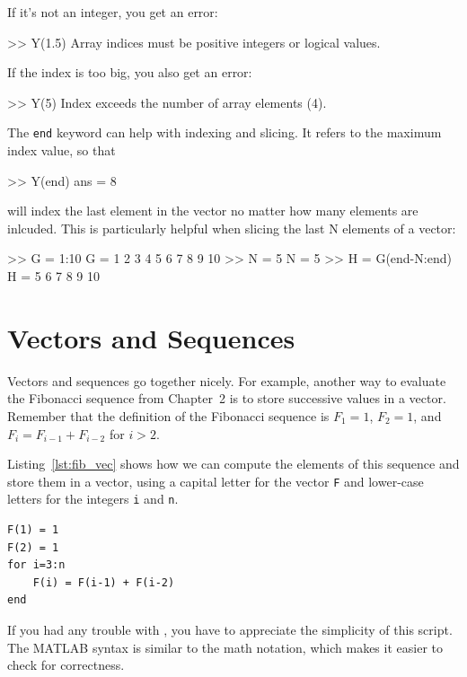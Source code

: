 If it's not an integer, you get an error:

\begin{code}
>> Y(1.5)
Array indices must be positive integers or logical values.
\end{code}

If the index is too big, you also get an error:

\begin{code}
>> Y(5)
Index exceeds the number of array elements (4).
\end{code}

The \lstinline{end} keyword can help with indexing and slicing.  It refers to the maximum index value, so that
\begin{code}
    >> Y(end)
    ans =
         8
\end{code}
will index the last element in the vector no matter how many elements are inlcuded.  This is particularly helpful when slicing the last N elements of a vector:
\begin{code}
    >> G = 1:10
    G =
         1     2     3     4     5     6     7     8     9    10
    >> N = 5
    N =
         5
    >> H = G(end-N:end)
    H =
         5     6     7     8     9    10
\end{code}

\section{Vectors and Sequences}
\label{vecseq}


Vectors and sequences go together nicely.
For example, another way to evaluate the Fibonacci sequence from Chapter~2 is to
store successive values in a vector.  Remember that the definition of the
Fibonacci sequence is $F_1 = 1$, $F_2 = 1$, and
$F_{i} = F_{i-1} + F_{i-2}$ for $i > 2$.

Listing~\ref{lst:fib_vec} shows how we can compute the elements of this sequence and store them in a vector, using a capital letter for the vector \lstinline{F}
and lower-case letters for the integers \lstinline{i} and \lstinline{n}.

\begin{lstlisting}[caption={Calculating the Fibonacci sequence using a vector}, label={lst:fib_vec}]
F(1) = 1
F(2) = 1
for i=3:n
    F(i) = F(i-1) + F(i-2)
end
\end{lstlisting}

If you had any trouble with , you have to
appreciate the simplicity of this script.  The MATLAB syntax is
similar to the math notation, which makes it easier to check for
correctness.

